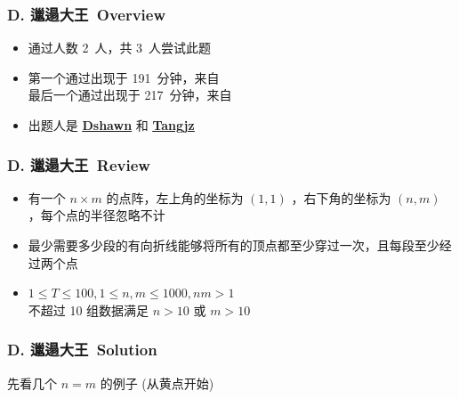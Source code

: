 \documentclass[notheorems]{beamer}
\newcommand{\zhProbD}{邋遢大王}		\newcommand{\AuthProbD}{\textbf{\underline{\href{http://codeforces.com/profile/Phasianus}{Dshawn}}} 和 \textbf{\underline{\href{http://codeforces.com/profile/Tangjz}{Tangjz}}}}
\newcommand{\AccInProbD}{2}	\newcommand{\SubInProbD}{3}	\newcommand{\RatInProbD}{66.67\%}
\newcommand{\FirPenInProbD}{191}	\newcommand{\FirPerInProbD}{\NONE}
\newcommand{\LasPenInProbD}{217}	\newcommand{\LasPerInProbD}{\NONE}
\begin{document}
\begin{frame}[label = ProbD]
\frametitle{D. \zhProbD\ Overview}
\begin{spacing}{2.0} \large
\begin{itemize}[<+->]
\item 通过人数 \AccInProbD\ 人，共 \SubInProbD\ 人尝试此题
\item 第一个通过出现于 \FirPenInProbD\ 分钟，来自 \FirPerInProbD\ 
\\ 最后一个通过出现于 \LasPenInProbD\ 分钟，来自 \LasPerInProbD\ 
\item 出题人是 \AuthProbD\ 
\end{itemize}
\end{spacing}
\end{frame}
\begin{frame}
\frametitle{D. \zhProbD\ Review}
\begin{spacing}{2.0} \large
\begin{itemize}[<+->]
\item 有一个 $n \times m$ 的点阵，左上角的坐标为 $(1,1)$ ，右下角的坐标为 $(n,m)$ ，每个点的半径忽略不计
\item 最少需要多少段的有向折线能够将所有的顶点都\alert{至少穿过一次}，且每段\alert{至少经过两个点}
\item $1 \leq T \leq 100, 1 \leq n, m \leq 1000, n m > 1$ \\ 不超过 10 组数据满足 $n>10$ 或 $m>10$
\end{itemize}
\end{spacing}
\end{frame}
\begin{frame}
\frametitle{D. \zhProbD\ Solution}
\begin{spacing}{2.0} \large
先看几个 $n = m$ 的例子 (从黄点开始) \pause


\end{spacing}
\end{frame}
\end{document}
